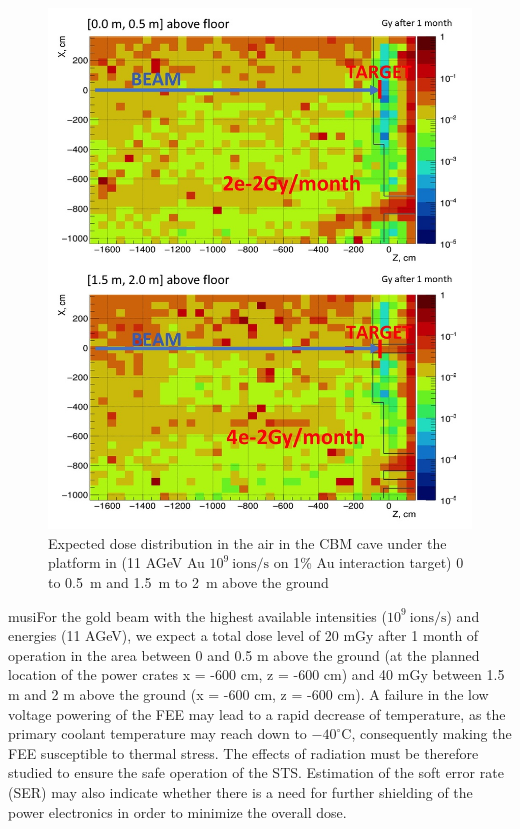 \begin{figure}[!h]
    \centering
    \includegraphics[width=0.55\columnwidth]{Chapter3/Irradiation/images/Dose00.jpg}
    \caption{Expected dose distribution in the air in the \gls{CBM}
cave under the platform in (11 AGeV Au $10^{9} \mathrm{\ ions/s}$ on 1\% Au
interaction target) 0 to 0.5 m and 1.5 m to 2 m above the ground} 
    \label{fig:mCBM}
\end{figure}

musiFor the gold beam with the highest available intensities ($10^{9}\mathrm{\ ions/s}$) and energies (11 AGeV), we expect a total dose level of 20 mGy after 1 month of operation in the area between 0 and 0.5 m above the ground (at the planned location of the power crates x = -600 cm, z = -600 cm) and 40 mGy between 1.5 m and 2 m above the ground (x = -600 cm, z = -600 cm). A failure in the low voltage powering of the FEE may lead to a rapid decrease of temperature, as the primary coolant temperature may reach down to $-40^{\circ}\mathrm{C}$, consequently making the FEE susceptible to thermal stress. The effects of radiation must be therefore studied to ensure the safe operation of the STS. Estimation of the soft error rate (\gls{SER}) may also indicate whether there is a need for further shielding of the power electronics in order to minimize the overall dose.


